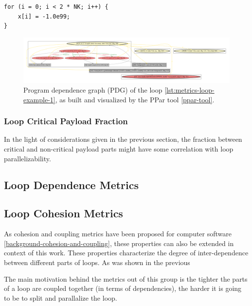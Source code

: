\begin{lstlisting}[float,floatplacement=H,caption={Parallelizible loop, with no cross-iteration dependencies. Taken from EP NAS benchmark.}, captionpos=b, label=lst:metrics-loop-example-1]
for (i = 0; i < 2 * NK; i++) {
	x[i] = -1.0e99;
}
\end{lstlisting}

\begin{figure}[htb]
	\centering
	\includegraphics[width=\linewidth]{figs/metrics-example-loop-1-pdg.pdf}
	\caption{Program dependence graph (PDG) of the loop \ref{lst:metrics-loop-example-1}, as built and visualized by the PPar tool \ref{ppar-tool}.}
	\label{metrics-example-loop-1-pdg}
\end{figure}

\subsubsection{Loop Critical Payload Fraction}
\label{metrics-loop-critical-payload-fraction}
\qquad In the light of considerations given in the previous section, the fraction between critical and non-critical payload parts might have some correlation with loop parallelizability.  

\subsection{Loop Dependence Metrics}
\label{metrics-loop-dependence-metrics}

\subsection{Loop Cohesion Metrics}
\label{metrics-loop-cohesion-metrics}
\qquad As cohesion and coupling metrics have been proposed for computer software \ref{background-cohesion-and-coupling}, these properties can also be extended in context of this work. \newline
\null\qquad These properties characterize the degree of inter-dependence between different parts of loops. As was shown in the previous 

The main motivation behind the metrics out of this group is the tighter the parts of a loop are coupled together (in terms of dependencies), the harder it is going to be to split and parallalize the loop.   


